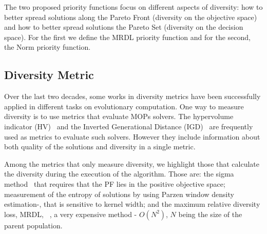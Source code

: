 The two proposed priority functions focus on different aspects of diversity:  how to better spread solutions along the Pareto Front (diversity on the objective space) and how to better spread solutions the Pareto Set (diversity on the decision space). For the first we define the MRDL priority function and for the second, the Norm priority function.



\subsection{Diversity Metric}


Over the last two decades, some works in diversity metrics have been successfully applied in different tasks on evolutionary computation. One way to measure diversity is to use metrics that evaluate MOPs solvers. The hypervolume indicator (HV)~\cite{zitzler1998multiobjective} and the Inverted Generational Distance (IGD)~\cite{zhang2008rm} are frequently used as metrics to evaluate such solvers. However they include information about both quality of the solutions and diversity in a single metric.

Among the metrics that only measure diversity, we highlight those that calculate the diversity during the execution of the algorithm. Those are: the sigma method~\cite{mostaghim2003strategies} that requires that the PF lies in the positive objective space; measurement of the entropy of solutions by using Parzen window density estimation-\cite{tan2008evolutionary}, that is sensitive to kernel width; and the maximum relative diversity loss, MRDL, ~\cite{gee2015online}, a very expensive method - $O(N^2)$, $N$ being the size of the parent population.


%

